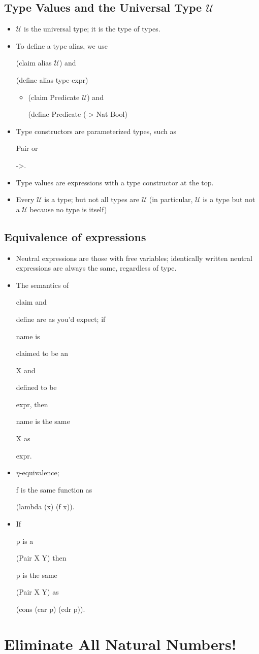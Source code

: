 \documentclass{article}
\newcommand*{\SavedLstInline}{}
\DeclareRobustCommand*{\lstinline}{%
  \ifmmode
    \let\SavedBGroup\bgroup
    \def\bgroup{%
      \let\bgroup\SavedBGroup
      \hbox\bgroup
    }%
  \fi
  \SavedLstInline
}
\begin{document}
\subsection{Type Values and the Universal Type \(\mathcal{U}\)}
\begin{itemize}
    \item \lstinline{$\mathcal{U}$} is the universal type; it is the type of types.
    \item To define a type alias, we use \lstinline{(claim alias $\mathcal{U}$)} and \lstinline{(define alias type-expr)}
        \begin{itemize}
            \item \lstinline{(claim Predicate $\mathcal{U}$)} and \lstinline{(define Predicate (-> Nat Bool)}
        \end{itemize}
    \item Type constructors are parameterized types, such as \lstinline{Pair} or \lstinline{->}.
    \item Type values are expressions with a type constructor at the top.
    \item Every \(\mathcal{U}\) is a type; but not all types are \(\mathcal{U}\) (in particular, \(\mathcal{U}\) is a type but not a \(\mathcal{U}\) because no type is itself)
\end{itemize}
\subsection{Equivalence of expressions}
\begin{itemize}
    \item Neutral expressions are those with free variables; identically written neutral expressions are always the same, regardless of type.
    \item The semantics of \lstinline{claim} and \lstinline{define} are as you'd expect; if \lstinline{name} is \lstinline{claim}ed to be an \lstinline{X} and \lstinline{define}d to be \lstinline{expr}, then \lstinline{name} is the same \lstinline{X} as \lstinline{expr}.
    \item \(\eta\)-equivalence; \lstinline{f} is the same function as \lstinline{(lambda (x) (f x))}.
    \item If \lstinline{p} is a \lstinline{(Pair X Y)} then \lstinline{p} is the same \lstinline{(Pair X Y)} as \lstinline{(cons (car p) (cdr p))}.
\end{itemize}
\section{Eliminate All Natural Numbers!}
\end{document}

